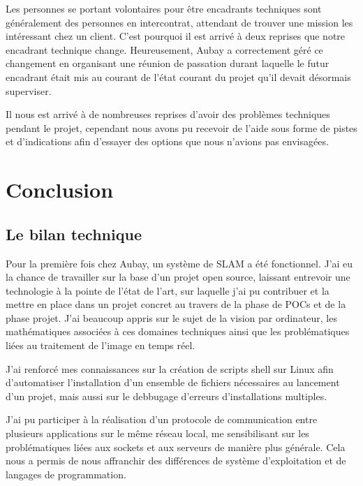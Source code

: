 \documentclass[11pt]{article}
\begin{document}
      Les personnes se portant volontaires pour être encadrants techniques sont généralement des personnes en
      intercontrat, attendant de trouver une mission les intéressant chez un client. C'est pourquoi il est 
      arrivé à deux reprises que notre encadrant technique change. Heureusement, Aubay a correctement géré 
      ce changement en organisant une réunion de passation durant laquelle le futur encadrant était mis au 
      courant de l'état courant du projet qu'il devait désormais superviser.

      Il nous est arrivé à de nombreuses reprises d'avoir des problèmes techniques pendant le projet, cependant 
      nous avons pu recevoir de l'aide sous forme de pistes et d'indications afin d'essayer des options que 
      nous n'avions pas envisagées.

  \pagebreak

  \section{Conclusion}

    \subsection{Le bilan technique}
      Pour la première fois chez Aubay, un système de SLAM a été fonctionnel. J'ai eu la chance de travailler sur la base d'un 
      projet open source, laissant entrevoir une technologie à la pointe de l'état de l'art, sur laquelle j'ai pu contribuer et la 
      mettre en place dans un projet concret au travers de la phase de POCs et de la phase projet. J'ai beaucoup appris sur le
      sujet de la vision par ordinateur, les mathématiques associées à ces domaines techniques ainsi que les problématiques 
      liées au traitement de l'image en temps réel.

      J'ai renforcé mes connaissances sur la création de scripts shell sur Linux afin d'automatiser l'installation d'un ensemble de 
      fichiers nécessaires au lancement d'un projet, mais aussi sur le debbugage d'erreurs d'installations multiples.
    
      J'ai pu participer à la réalisation d'un protocole de communication entre plusieurs applications sur le même réseau local, me 
      sensibilisant sur les problématiques liées aux sockets et aux serveurs de manière plus générale.
      Cela nous a permis de nous affranchir des différences de système d'exploitation et de langages de programmation. 
      
\end{document}
